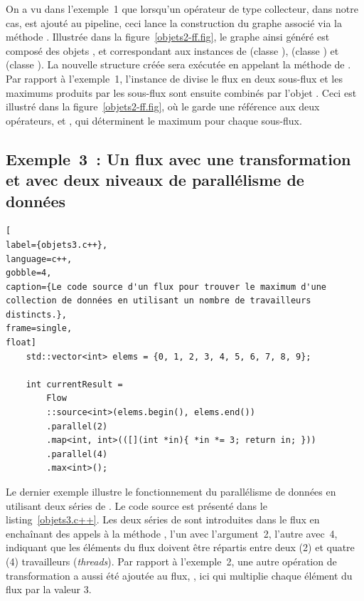 On a vu dans l'exemple~1 que lorsqu'un op\'erateur de type collecteur,  dans notre cas, est ajout\'e au {pipeline}, ceci lance la construction du graphe  associ\'e via la m\'ethode . Illustr\'ee dans la figure~\ref{objets2-ff.fig}, le graphe ainsi g\'en\'er\'e est compos\'e des objets ,  et  correspondant aux instances de   (classe ),  (classe ) et  (classe ). La nouvelle structure cr\'e\'ee sera ex\'ecut\'ee en appelant la m\'ethode  de . Par rapport \`a l'exemple~1, l'instance de  divise le flux en deux sous-flux et les maximums produits par les sous-flux sont ensuite combin\'es par l'objet . Ceci est illustr\'e dans la figure~\ref{objets2-ff.fig}, o\`u le  garde une r\'ef\'erence aux deux op\'erateurs,  et , qui d\'eterminent le maximum pour chaque sous-flux.




\subsection{Exemple~3~: Un flux avec une transformation et avec deux niveaux de parallélisme de données}


\begin{lstlisting}[
label={objets3.c++},
language=c++,
gobble=4,
caption={Le code source d'un flux pour trouver le maximum d'une collection de données en utilisant un nombre de travailleurs distincts.},
frame=single,
float]
    std::vector<int> elems = {0, 1, 2, 3, 4, 5, 6, 7, 8, 9};

    int currentResult =
        Flow
        ::source<int>(elems.begin(), elems.end())
        .parallel(2)
        .map<int, int>(([](int *in){ *in *= 3; return in; }))
        .parallel(4)
        .max<int>();
\end{lstlisting}

Le dernier exemple illustre le fonctionnement du parallélisme de données en utilisant deux s\'eries de . Le code source est présenté dans le listing~\ref{objets3.c++}. Les deux s\'eries de  sont introduites dans le flux en encha\^inant des appels à la m\'ethode , l'un avec l'argument~2, l'autre avec~4, indiquant que les \'el\'ements du flux doivent être r\'epartis entre deux (2) et quatre (4) travailleurs (\emph{threads}). Par rapport à l'exemple~2, une autre opération de transformation a aussi \'et\'e ajout\'ee au flux, , ici qui multiplie chaque \'el\'ement du flux par la valeur 3.



